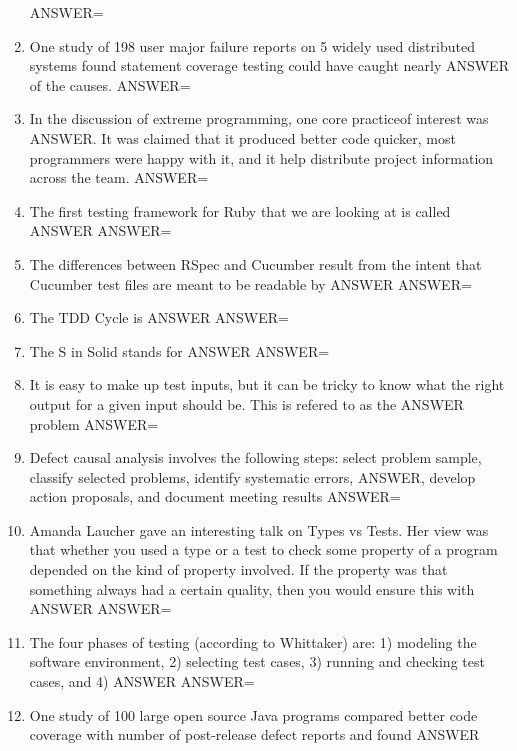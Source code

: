 \documentclass{exam}
\begin{document}
\begin{enumerate}
ANSWER=
\item One study of 198 user major failure reports on 5 widely used distributed systems found statement coverage testing could have caught nearly ANSWER of the causes.\newline
ANSWER=
\item In the discussion of extreme programming, one core practiceof interest was ANSWER.  It was claimed that it produced better code quicker, most programmers were happy with it, and it help distribute project information across the team.\newline
ANSWER=
\item The first testing framework for Ruby that we are looking at is called ANSWER\newline
ANSWER=
\item The differences between RSpec and Cucumber result from the intent that Cucumber test files are meant to be readable by ANSWER\newline
ANSWER=
\item The TDD Cycle is ANSWER\newline
ANSWER=
\item The S in Solid stands for ANSWER\newline
ANSWER=
\item It is easy to make up test inputs, but it can be tricky to know what the right output for a given input should be.  This is refered to as the ANSWER problem\newline
ANSWER=
\item Defect causal analysis involves the following steps: select problem sample, classify selected problems, identify systematic errors, ANSWER, develop action proposals, and document meeting results\newline
ANSWER=
\item Amanda Laucher gave an interesting talk on Types vs Tests.  Her view was that whether you used a type or a test to check some property of a program depended on the kind of property involved.  If the property was that something always had a certain quality, then you would ensure this with ANSWER\newline
ANSWER=
\item The four phases of testing (according to Whittaker) are: 1) modeling the software environment, 2) selecting test cases, 3) running and checking test cases, and 4) ANSWER\newline
ANSWER=
\item One study of 100 large open source Java programs compared better code coverage with number of post-release defect reports and found ANSWER\newline

\end{enumerate}
\end{document}

